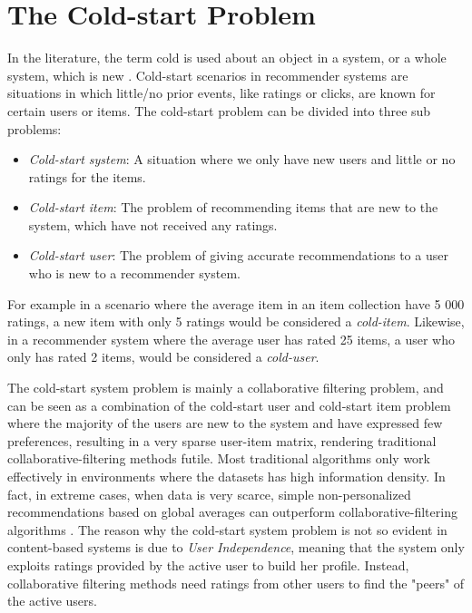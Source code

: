 \section{The Cold-start Problem}


In the literature, the term cold is used about an object in a system, or a
whole system, which is new \cite{Schein2002, Park2006}. Cold-start scenarios in recommender systems are
situations in which little/no prior events, like ratings or clicks, are known
for certain users or items. The cold-start problem can be divided into three sub problems:

\begin{itemize}
  \item \emph{Cold-start system}: A situation where we only have new users and
  little or no ratings for the items.

  \item \emph{Cold-start item}: The problem of recommending items that are new
  to the system, which have not received any ratings.

  \item \emph{Cold-start user}: The problem of giving accurate recommendations
  to a user who is new to a recommender system.
\end{itemize}


For example in a scenario where the average item in an item collection have 5
000 ratings, a new item with only 5 ratings would be considered a
\emph{cold-item}. Likewise, in a recommender system where the average user has
rated 25 items, a user who only has rated 2 items, would be considered a
\emph{cold-user}.

The cold-start system problem is mainly a collaborative filtering problem, and
can be seen as a combination of the cold-start user and cold-start item problem
where the majority of the users are new to the system and have expressed few
preferences, resulting in a very sparse user-item matrix, rendering traditional
collaborative-filtering methods futile. Most traditional algorithms only work
effectively in environments where the datasets has high information density. In
fact, in extreme cases, when data is very scarce, simple non-personalized
recommendations based on global averages can outperform collaborative-filtering
algorithms \cite{Park2006}. The reason why the cold-start system problem is not
so evident in content-based systems is due to \emph{User Independence}, meaning
that the system only exploits ratings provided by the active user to build her
profile. Instead, collaborative filtering methods need ratings from other users
to find the "peers" of the active users.

